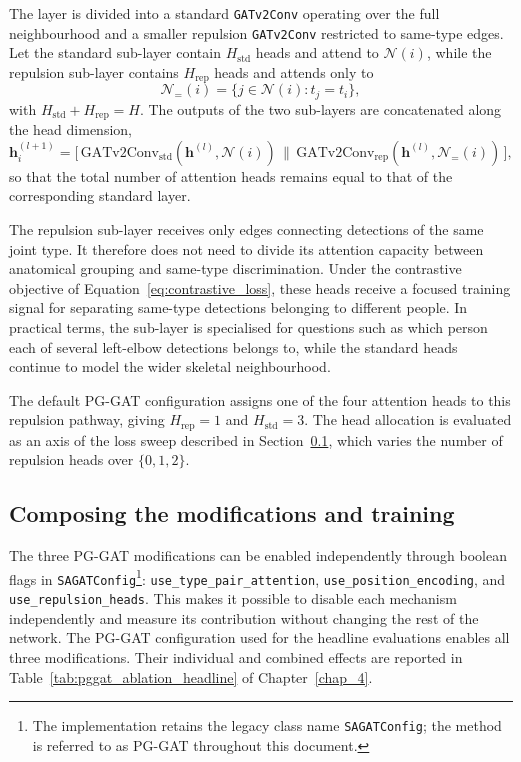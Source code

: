 The layer is divided into a standard \texttt{GATv2Conv}
operating over the full neighbourhood
and a smaller repulsion \texttt{GATv2Conv}
restricted to same-type edges.
Let the standard sub-layer contain $H_{\text{std}}$ heads
and attend to $\mathcal{N}(i)$,
while the repulsion sub-layer contains $H_{\text{rep}}$ heads
and attends only to
\begin{equation}
    \mathcal{N}_{=}(i)
    =
    \{j \in \mathcal{N}(i) : t_j=t_i\},
\end{equation}
with $H_{\text{std}}+H_{\text{rep}}=H$.
The outputs of the two sub-layers are concatenated
along the head dimension,
\begin{equation}
    \mathbf{h}_i^{(l+1)}
    =
    \bigl[\,
        \mathrm{GATv2Conv}_{\text{std}}
        (\mathbf{h}^{(l)},\mathcal{N}(i))
        \,\big\|\,
        \mathrm{GATv2Conv}_{\text{rep}}
        (\mathbf{h}^{(l)},\mathcal{N}_{=}(i))
    \,\bigr],
    \label{eq:pggat_repulsion}
\end{equation}
so that the total number of attention heads remains equal
to that of the corresponding standard layer.

The repulsion sub-layer receives only edges connecting detections of
the same joint type.
It therefore does not need to divide its attention capacity
between anatomical grouping and same-type discrimination.
Under the contrastive objective of
Equation~\eqref{eq:contrastive_loss},
these heads receive a focused training signal
for separating same-type detections belonging to different people.
In practical terms,
the sub-layer is specialised for questions such as
which person each of several left-elbow detections belongs to,
while the standard heads continue to model the wider
skeletal neighbourhood.

The default PG-GAT configuration assigns one of the four attention
heads to this repulsion pathway,
giving $H_{\text{rep}}=1$ and $H_{\text{std}}=3$.
The head allocation is evaluated as an axis of the loss sweep
described in Section~\ref{sec_meth_pggat_training},
which varies the number of repulsion heads over $\{0, 1, 2\}$.

\subsection{Composing the modifications and training}
\label{sec_meth_pggat_training}

The three PG-GAT modifications can be enabled independently through
boolean flags in \texttt{SAGATConfig}\footnote{The implementation
retains the legacy class name \texttt{SAGATConfig}; the method is
referred to as PG-GAT throughout this document.}:
\texttt{use\_type\_pair\_attention},
\texttt{use\_position\_encoding}, and
\texttt{use\_repulsion\_heads}.
This makes it possible to disable each mechanism independently
and measure its contribution without changing the rest of the network.
The PG-GAT configuration used for the headline evaluations
enables all three modifications.
Their individual and combined effects are reported in
Table~\ref{tab:pggat_ablation_headline} of Chapter~\ref{chap_4}.

